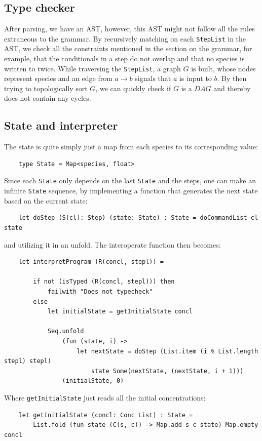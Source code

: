 \subsection{Type checker}
After parsing, we have an AST, however, this AST might not follow all the rules extraneous to the grammar. By recursively matching on each \texttt{StepList} in the AST, we check all the constraints mentioned in the section on the grammar, for example, that the conditionals in a step do not overlap and that no species is written to twice. While traversing the \texttt{StepList}, a graph $G$ is built, whose nodes represent species and an edge from $a\to b$ signals that $a$ is input to $b$. By then trying to topologically sort $G$, we can quickly check if $G$ is a $DAG$ and thereby does not contain any cycles.

\subsection{State and interpreter}
The state is quite simply just a map from each species to its corresponding value:
\begin{verbatim}
    type State = Map<species, float>
\end{verbatim}
Since each \texttt{State} only depends on the last \texttt{State} and the steps, one can make an infinite \texttt{State} sequence, by implementing a function that generates the next state based on the current state:
\begin{verbatim}
    let doStep (S(cl): Step) (state: State) : State = doCommandList cl state
\end{verbatim}
and utilizing it in an unfold. The interoperate function then becomes:
\begin{verbatim}
    let interpretProgram (R(concl, stepl)) =

        if not (isTyped (R(concl, stepl))) then
            failwith "Does not typecheck"
        else
            let initialState = getInitialState concl
    
            Seq.unfold
                (fun (state, i) ->
                    let nextState = doStep (List.item (i % List.length stepl) stepl)
                        state Some(nextState, (nextState, i + 1)))
                (initialState, 0)
\end{verbatim}

Where \texttt{getInitialState} just reads all the initial concentrations:
\begin{verbatim}
    let getInitialState (concl: Conc List) : State =
        List.fold (fun state (C(s, c)) -> Map.add s c state) Map.empty concl
\end{verbatim}

